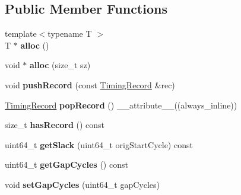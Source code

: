 \subsection*{Public Member Functions}
\begin{DoxyCompactItemize}
\item 
\hypertarget{classEventRecorder_a159f84907e26da94afefa727d0237305}{{\footnotesize template$<$typename T $>$ }\\T $\ast$ {\bfseries alloc} ()}\label{classEventRecorder_a159f84907e26da94afefa727d0237305}

\item 
\hypertarget{classEventRecorder_a41c38d3c5d52714385b52d276c2c1aa3}{void $\ast$ {\bfseries alloc} (size\-\_\-t sz)}\label{classEventRecorder_a41c38d3c5d52714385b52d276c2c1aa3}

\item 
\hypertarget{classEventRecorder_afc30252e62f21bc42a05eae12db00b70}{void {\bfseries push\-Record} (const \hyperlink{structTimingRecord}{Timing\-Record} \&rec)}\label{classEventRecorder_afc30252e62f21bc42a05eae12db00b70}

\item 
\hypertarget{classEventRecorder_a4a79087d8409e82b3b41fd2e4b5ecdef}{\hyperlink{structTimingRecord}{Timing\-Record} {\bfseries pop\-Record} () \-\_\-\-\_\-attribute\-\_\-\-\_\-((always\-\_\-inline))}\label{classEventRecorder_a4a79087d8409e82b3b41fd2e4b5ecdef}

\item 
\hypertarget{classEventRecorder_a335b5de4de0e0144d7829f8c75279f32}{size\-\_\-t {\bfseries has\-Record} () const }\label{classEventRecorder_a335b5de4de0e0144d7829f8c75279f32}

\item 
\hypertarget{classEventRecorder_a40ad92b26f50d5bae3daabe6c9485d19}{uint64\-\_\-t {\bfseries get\-Slack} (uint64\-\_\-t orig\-Start\-Cycle) const }\label{classEventRecorder_a40ad92b26f50d5bae3daabe6c9485d19}

\item 
\hypertarget{classEventRecorder_a49733c855c908748a220eaa61371bf8b}{uint64\-\_\-t {\bfseries get\-Gap\-Cycles} () const }\label{classEventRecorder_a49733c855c908748a220eaa61371bf8b}

\item 
\hypertarget{classEventRecorder_a738bacb75d4ae584eb44fa9dcba6ee7a}{void {\bfseries set\-Gap\-Cycles} (uint64\-\_\-t gap\-Cycles)}\label{classEventRecorder_a738bacb75d4ae584eb44fa9dcba6ee7a}


\end{DoxyCompactItemize}

